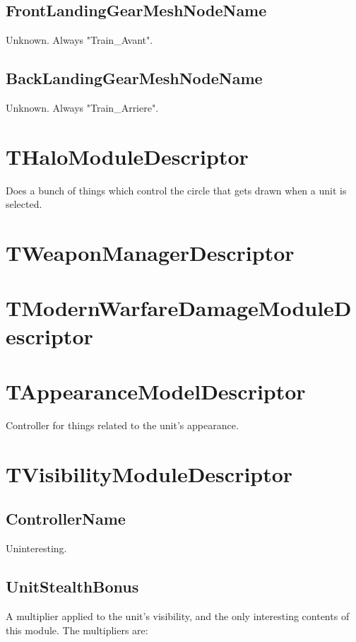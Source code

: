\documentclass{article}
\begin{document}
\subsection{FrontLandingGearMeshNodeName}

Unknown. Always "Train\_Avant".

\subsection{BackLandingGearMeshNodeName}

Unknown. Always "Train\_Arriere".

\section{THaloModuleDescriptor}

Does a bunch of things which control the circle that gets drawn when a unit is selected.

\section{TWeaponManagerDescriptor}

\section{TModernWarfareDamageModuleDescriptor}

\section{TAppearanceModelDescriptor}

Controller for things related to the unit's appearance.

\section{TVisibilityModuleDescriptor}

\subsection{ControllerName}

Uninteresting.

\subsection{UnitStealthBonus}

A multiplier applied to the unit's visibility, and the only interesting contents of this module. The multipliers are:
\end{document}
